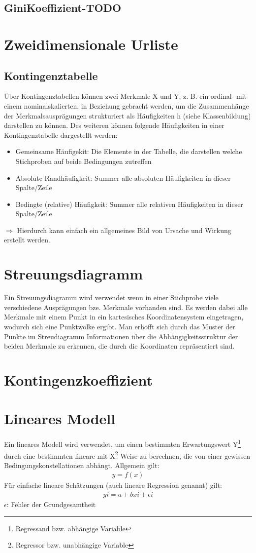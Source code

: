 \documentclass[a4paper,10pt]{scrartcl}
\begin{document}
\subsection{GiniKoeffizient-TODO}
\section{Zweidimensionale Urliste}
\subsection{Kontingenztabelle}
Über Kontingenztabellen können zwei Merkmale X und Y, z. B. ein ordinal- mit einem nominalskalierten, in Beziehung gebracht werden, um die Zusammenhänge der Merkmalsausprägungen strukturiert als Häufigkeiten h (siehe Klassenbildung) darstellen zu können. Des weiteren können folgende Häufigkeiten in einer Kontingenztabelle dargestellt werden:
\begin{itemize}
    \item Gemeinsame Häufigekit: Die Elemente in der Tabelle, die darstellen welche Stichproben auf beide Bedingungen zutreffen
    \item Absolute Randhäufigkeit: Summer alle absoluten Häufigkeiten in dieser Spalte/Zeile
    \item Bedingte (relative) Häufigkeit: Summer alle relativen Häufigkeiten in dieser Spalte/Zeile
\end{itemize}
$\Rightarrow$ Hierdurch kann einfach ein allgemeines Bild von Ursache und Wirkung erstellt werden.
\section{Streuungsdiagramm}
Ein Streuungsdiagramm wird verwendet wenn in einer Stichprobe viele verschiedene Ausprägungen bze. Merkmale vorhanden sind. Es werden dabei alle Merkmale mit einem Punkt in ein kartesisches Koordinatensystem eingetragen, wodurch sich eine Punktwolke ergibt. Man erhofft sich durch das Muster der Punkte im Streudiagramm Informationen über die Abhängigkeitsstruktur der beiden Merkmale zu erkennen, die durch die Koordinaten repräsentiert sind.
\newpage
\section{Kontingenzkoeffizient}
\section{Lineares Modell}
Ein lineares Modell wird verwendet, um einen bestimmten Erwartungswert Y\footnote{Regressand bzw. abhängige Variable} durch eine bestimmten lineare mit X\footnote{Regressor bzw. unabhängige Variable} Weise zu berechnen, die von einer gewissen Bedingungskonstellationen abhängt. Allgemein gilt:
\begin{eqnarray*}
y = f(x)
\end{eqnarray*}
Für einfache lineare Schätzungen (auch lineare Regression genannt) gilt:
\begin{eqnarray*}
yi = a + bxi + \epsilon i
\end{eqnarray*}
$\epsilon$: Fehler der Grundgesamtheit \newline
\end{document}
